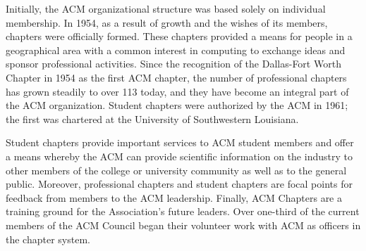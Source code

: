 Initially, the ACM organizational structure was based solely on individual membership. In 1954, as a result of growth and the wishes of its members, chapters were officially formed. These chapters provided a means for people in a geographical area with a common interest in computing to exchange ideas and sponsor professional activities. Since the recognition of the Dallas-Fort Worth Chapter in 1954 as the first ACM chapter, the number of professional chapters has grown steadily to over 113 today, and they have become an integral part of the ACM organization. Student chapters were authorized by the ACM in 1961; the first was chartered at the University of Southwestern Louisiana.

Student chapters provide important services to ACM student members and offer a means whereby the ACM can provide scientific information on the industry to other members of the college or university community as well as to the general public. Moreover, professional chapters and student chapters are focal points for feedback from members to the ACM leadership. Finally, ACM Chapters are a training ground for the Association's future leaders. Over one-third of the current members of the ACM Council began their volunteer work with ACM as officers in the chapter system.

